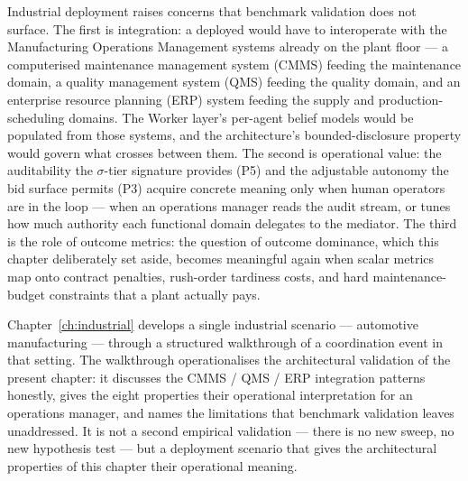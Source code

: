 Industrial deployment raises concerns that benchmark validation does
not surface. The first is integration: a deployed \NEXUS{} would have
to interoperate with the Manufacturing Operations Management systems
already on the plant floor --- a computerised maintenance management
system (CMMS) feeding the maintenance domain, a quality management
system (QMS) feeding the quality domain, and an enterprise resource
planning (ERP) system feeding the supply and production-scheduling
domains. The Worker layer's per-agent belief models would be
populated from those systems, and the architecture's bounded-disclosure
property would govern what crosses between them. The second is
operational value: the auditability the $\sigma$-tier signature
provides (P5) and the adjustable autonomy the bid surface permits
(P3) acquire concrete meaning only when human operators are in the
loop --- when an operations manager reads the audit stream, or tunes
how much authority each functional domain delegates to the mediator.
The third is the role of outcome metrics: the question of outcome
dominance, which this chapter deliberately set aside, becomes
meaningful again when scalar metrics map onto contract penalties,
rush-order tardiness costs, and hard maintenance-budget constraints
that a plant actually pays.

Chapter~\ref{ch:industrial} develops a single industrial scenario ---
automotive manufacturing --- through a structured walkthrough of a
coordination event in that setting. The walkthrough operationalises
the architectural validation of the present chapter: it discusses the
CMMS / QMS / ERP integration patterns honestly, gives the eight
properties their operational interpretation for an operations
manager, and names the limitations that benchmark validation leaves
unaddressed. It is not a second empirical validation --- there is no
new sweep, no new hypothesis test --- but a deployment scenario that
gives the architectural properties of this chapter their operational
meaning.

